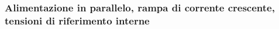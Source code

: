 % 
%

\subsubsection{Alimentazione in parallelo, rampa di corrente crescente, tensioni di riferimento interne} 

